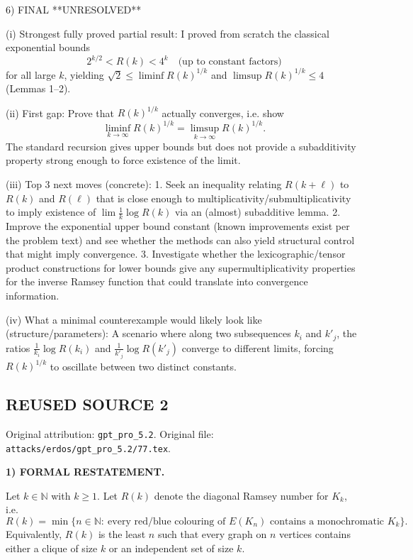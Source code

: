 6) FINAL
**UNRESOLVED**

(i) Strongest fully proved partial result:
I proved from scratch the classical exponential bounds
\[2^{k/2} < R(k) < 4^k\quad\text{(up to constant factors)}\]
for all large $k$, yielding $\sqrt2\le \liminf R(k)^{1/k}$ and $\limsup R(k)^{1/k}\le 4$ (Lemmas 1--2).

(ii) First gap:
Prove that $R(k)^{1/k}$ actually converges, i.e. show
\[\liminf_{k\to\infty} R(k)^{1/k}=\limsup_{k\to\infty} R(k)^{1/k}.\]
The standard recursion gives upper bounds but does not provide a subadditivity property strong enough to force existence of the limit.

(iii) Top 3 next moves (concrete):
1. Seek an inequality relating $R(k+\ell)$ to $R(k)$ and $R(\ell)$ that is close enough to multiplicativity/submultiplicativity to imply existence of $\lim \frac{1}{k}\log R(k)$ via an (almost) subadditive lemma.
2. Improve the exponential upper bound constant (known improvements exist per the problem text) and see whether the methods can also yield structural control that might imply convergence.
3. Investigate whether the lexicographic/tensor product constructions for lower bounds give any supermultiplicativity properties for the inverse Ramsey function that could translate into convergence information.

(iv) What a minimal counterexample would likely look like (structure/parameters):
A scenario where along two subsequences $k_i$ and $k'_j$, the ratios $\frac{1}{k_i}\log R(k_i)$ and $\frac{1}{k'_j}\log R(k'_j)$ converge to different limits,
forcing $R(k)^{1/k}$ to oscillate between two distinct constants.



\subsection*{REUSED SOURCE 2}
Original attribution: \texttt{gpt\_pro\_5.2}.
Original file: \texttt{attacks/erdos/gpt\_pro\_5.2/77.tex}.



\noindent\textbf{1) FORMAL RESTATEMENT.}

Let $k\in\mathbb{N}$ with $k\ge 1$. Let $R(k)$ denote the diagonal Ramsey number for $K_k$, i.e.
\[
R(k)=\min\{n\in\mathbb{N}:\ \text{every red/blue colouring of }E(K_n)\text{ contains a monochromatic }K_k\}.
\]
Equivalently, $R(k)$ is the least $n$ such that every graph on $n$ vertices contains either a clique of size $k$ or an independent set of size $k$.

